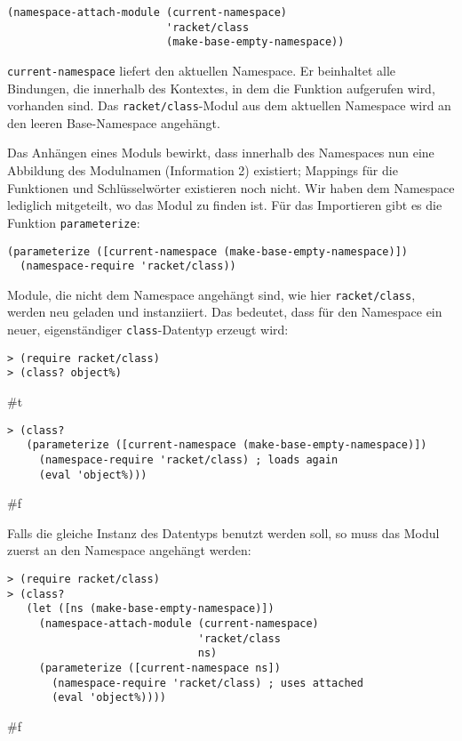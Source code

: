 \begin{lstlisting}
(namespace-attach-module (current-namespace)
                         'racket/class
                         (make-base-empty-namespace))
\end{lstlisting}

\texttt{current-namespace} liefert den aktuellen Namespace. Er beinhaltet alle Bindungen, die innerhalb des Kontextes, in dem die Funktion aufgerufen wird, vorhanden sind. Das \texttt{racket/class}-Modul aus dem aktuellen Namespace wird an den leeren Base-Namespace angehängt.

Das Anhängen eines Moduls bewirkt, dass innerhalb des Namespaces nun eine Abbildung des Modulnamen (Information 2) existiert; Mappings für die Funktionen und Schlüsselwörter existieren noch nicht. Wir haben dem Namespace lediglich mitgeteilt, wo das Modul zu finden ist. Für das Importieren gibt es die Funktion \texttt{parameterize}:

\begin{lstlisting}
(parameterize ([current-namespace (make-base-empty-namespace)])
  (namespace-require 'racket/class))
\end{lstlisting}

Module, die nicht dem Namespace angehängt sind, wie hier \texttt{racket/class}, werden neu geladen und instanziiert. Das bedeutet, dass für den Namespace ein neuer, eigenständiger \texttt{class}-Datentyp erzeugt wird:

\begin{lstlisting}
> (require racket/class)
> (class? object%)
\end{lstlisting}
{\routput \#t}

\begin{lstlisting}
> (class?
   (parameterize ([current-namespace (make-base-empty-namespace)])
     (namespace-require 'racket/class) ; loads again
     (eval 'object%)))
\end{lstlisting}
{\routput \#f}

Falls die gleiche Instanz des Datentyps benutzt werden soll, so muss das Modul zuerst an den Namespace angehängt werden:

\begin{lstlisting}
> (require racket/class)
> (class?
   (let ([ns (make-base-empty-namespace)])
     (namespace-attach-module (current-namespace)
                              'racket/class
                              ns)
     (parameterize ([current-namespace ns])
       (namespace-require 'racket/class) ; uses attached
       (eval 'object%))))
\end{lstlisting}
{\routput \#f}

